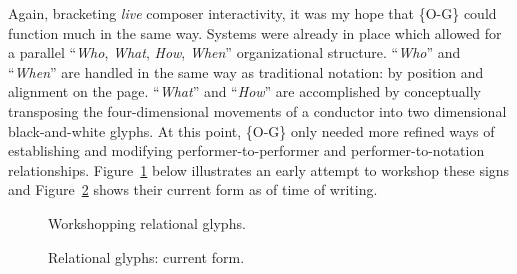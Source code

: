     Again, bracketing \textit{live} composer interactivity, it was my hope that \{O-G\} could function much in the same way. Systems were already in place which allowed for a parallel ``\textit{Who}, \textit{What}, \textit{How}, \textit{When}'' organizational structure. ``\textit{Who}'' and ``\textit{When}'' are handled in the same way as traditional notation: by position and alignment on the page. ``\textit{What}'' and ``\textit{How}'' are accomplished by conceptually transposing the four-dimensional movements of a conductor into two dimensional black-and-white glyphs. At this point, \{O-G\} only needed more refined ways of establishing and modifying performer-to-performer and performer-to-notation relationships. Figure~\ref{fig:relational1} below illustrates an early attempt to workshop these signs and Figure~\ref{fig:relational2} shows their current form as of time of writing.

        \begin{figure}
            \centering
            \captionsetup{width=.5\textwidth} 
            \caption{Workshopping relational glyphs.}
            \label{fig:relational1}
        \end{figure}

        \begin{figure}
            \centering
            \captionsetup{width=.5\textwidth} 
            \caption{Relational glyphs: current form.}
            \label{fig:relational2}
        \end{figure}

